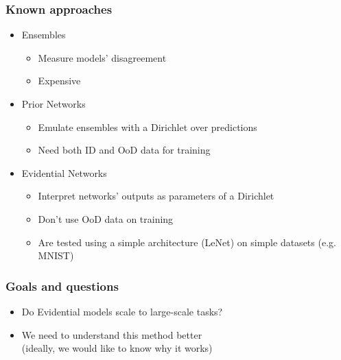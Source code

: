 \documentclass[]{beamer}
\begin{document}
\begin{frame} \frametitle{Known approaches}
	\begin{itemize}
        \item Ensembles
        \begin{itemize}
            \item Measure models' disagreement
            \item Expensive \newline
        \end{itemize}
        \pause
	    \item Prior Networks
	    \begin{itemize}
            \item Emulate ensembles with a Dirichlet over predictions
            \item Need both ID and OoD data for training \newline
	    \end{itemize}
	    \pause
	    \item Evidential Networks
        \begin{itemize}
            \item Interpret networks' outputs as parameters of a Dirichlet
            \item Don't use OoD data on training
            \item Are tested using a simple architecture (LeNet) on simple datasets (e.g. MNIST)
	    \end{itemize}
	\end{itemize}
\end{frame}

\begin{frame} \frametitle{Goals and questions}
    \begin{itemize}
        \item Do Evidential models scale to large-scale tasks? \newline \par
        \item We need to understand this method better \\ (ideally, we would like to know why it works)
    \end{itemize}
\end{frame}
\end{document}
